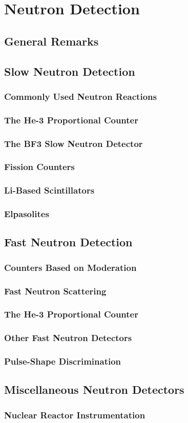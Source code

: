 \section{Neutron Detection}
\subsection{General Remarks}

\subsection{Slow Neutron Detection}
\subsubsection{Commonly Used Neutron Reactions}
\subsubsection{The He-3 Proportional Counter}
\subsubsection{The BF3 Slow Neutron Detector}
\subsubsection{Fission Counters}
\subsubsection{Li-Based Scintillators}
\subsubsection{Elpasolites}

\subsection{Fast Neutron Detection}
\subsubsection{Counters Based on Moderation}
\subsubsection{Fast Neutron Scattering}
\subsubsection{The He-3 Proportional Counter}
\subsubsection{Other Fast Neutron Detectors}
\subsubsection{Pulse-Shape Discrimination}

\subsection{Miscellaneous Neutron Detectors}
\subsubsection{Nuclear Reactor Instrumentation}